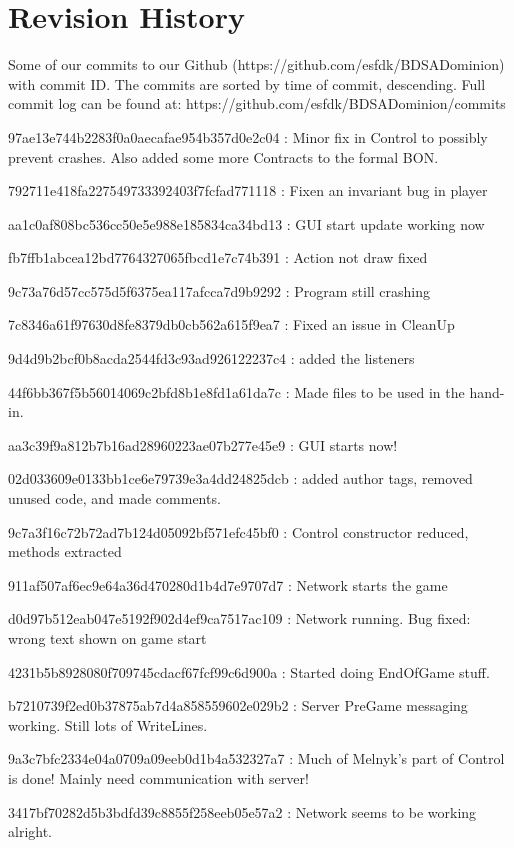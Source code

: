 \section{Revision History}
Some of our commits to our Github (https://github.com/esfdk/BDSADominion)  with commit ID. The commits are sorted by time of commit, descending. Full commit log can be found at: https://github.com/esfdk/BDSADominion/commits



97ae13e744b2283f0a0aecafae954b357d0e2c04 : Minor fix in Control to possibly prevent crashes. Also added some more Contracts to the formal BON.

792711e418fa227549733392403f7fcfad771118 : Fixen an invariant bug in player

aa1c0af808bc536cc50e5e988e185834ca34bd13 : GUI start update working now

fb7ffb1abcea12bd7764327065fbcd1e7c74b391 : Action not draw fixed

9c73a76d57cc575d5f6375ea117afcca7d9b9292 : Program still crashing

7c8346a61f97630d8fe8379db0cb562a615f9ea7 : Fixed an issue in CleanUp

9d4d9b2bcf0b8acda2544fd3c93ad926122237c4 : added the listeners

44f6bb367f5b56014069c2bfd8b1e8fd1a61da7c : Made files to be used in the hand-in.

aa3c39f9a812b7b16ad28960223ae07b277e45e9 : GUI starts now!

02d033609e0133bb1ce6e79739e3a4dd24825dcb : added author tags, removed unused code, and made comments.

9c7a3f16c72b72ad7b124d05092bf571efc45bf0 : Control constructor reduced, methods extracted

911af507af6ec9e64a36d470280d1b4d7e9707d7 : Network starts the game

d0d97b512eab047e5192f902d4ef9ca7517ac109 : Network running. Bug fixed: wrong text shown on game start

4231b5b8928080f709745cdacf67fcf99c6d900a : Started doing EndOfGame stuff.

b7210739f2ed0b37875ab7d4a858559602e029b2 : Server PreGame messaging working. Still lots of WriteLines.

9a3c7bfc2334e04a0709a09eeb0d1b4a532327a7 : Much of Melnyk's part of Control is done! Mainly need communication with server!

3417bf70282d5b3bdfd39c8855f258eeb05e57a2 : Network seems to be working alright.

